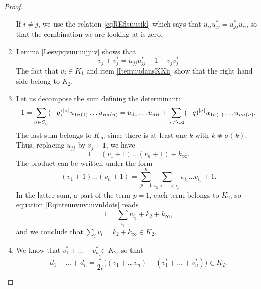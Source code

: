 \begin{proof}
\begin{enumerate}
            If $i\neq j$, we use the relation \eqref{eqREflsuusikl} which says that $u_{ii}u_{jj}^*=u_{jj}^*u_{ii}$, so that the combination we are looking at is zero.
        \item
            Lemma \ref{Lesvjvjvuuuujjiiv} shows that
            \begin{equation}        \label{Eqvvuiiujjvv}
                v_j+v_j^*=u_{jj}u_{jj}^*-1-v_jv_j^*
            \end{equation}
            The fact that $v_j\in K_1$ and item \ref{ItemuudansKKii} show that the right hand side belong to $K_2$.        
        \item
            Let us decompose the sum defining the determinant:
            \begin{equation}
                1=\sum_{\sigma\in S_n}(-q)^{| \sigma |}u_{1\sigma(1)}\ldots u_{n\sigma(n)}=u_{11}\ldots u_{nn}+\sum_{\sigma\neq \id}(-q)^{| \sigma |}u_{1\sigma(1)}\ldots u_{n\sigma(n)}.
            \end{equation}
            The last sum belongs to $K_{\infty}$ since there is at least one $k$ with $k\neq \sigma(k)$. Thus, replacing $u_{jj}$ by $v_j+1$,  we have
            \begin{equation}        \label{Eqinteunvuvuuvnldots}
                1=(v_1+1)\ldots (v_n+1)+k_{\infty}.
            \end{equation}
            The product can be written under the form
            \begin{equation}
                (v_1+1)\ldots(v_n+1)=\sum_{p=1}^n\sum_{i_1<\ldots<i_p}v_{i_1}\ldots v_{i_p}+1.
            \end{equation}
            In the latter sum, a part of the term $p=1$, each term belongs to $K_2$, so equation \eqref{Eqinteunvuvuuvnldots} reads
            \begin{equation}
                1=\sum_{i_1}v_{i_1}+k_2+k_{\infty},
            \end{equation}
            and we conclude that $\sum_iv_i=k_2+k_{\infty}\in K_2$.
        \item
            We know that $v_1^*+\ldots +v_n^*\in K_2$, so that
            \begin{equation}
                d_1+\ldots+ d_n=\frac{1}{ 2i }\big( (v_1+\ldots v_n)-(v_1^*+\ldots +v_n^*) \big)\in K_2.
            \end{equation}
    \end{enumerate}
    
\end{proof}

